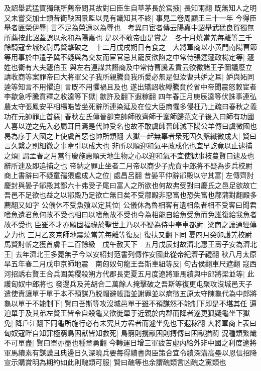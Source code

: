 及詔舉武猛賀獨無所薦帝問其故對曰臣生自草茅長於宫掖|{
	長知兩翻}
既無知人之明又未嘗交加士類昔衛鞅因景監以見有識知其不終|{
	事見二卷周顯王三十一年}
今得臣舉者匪榮伊辱|{
	言不足為榮適以為辱也　考異曰宦者傳云陽嘉中詔舉武猛良賀獨無所薦按此詔蓋誤以永和為陽嘉也}
是以不敢帝由是賞之　冬十月燒當羌每離等三千餘騎寇金城校尉馬賢擊破之　十二月戊戌朔日有食之　大將軍商以小黄門南陽曹節等用事於中遣子冀不疑與為交友而宦官忌其寵反欲陷之中常侍張逵蘧政楊定等|{
	蘧姓也衛有大夫蘧伯玉}
與左右連謀共譖商及中常侍曹騰孟賁云欲徵諸王子圖議廢立請收商等案罪帝曰大將軍父子我所親騰賁我所愛必無是但汝曹共妒之耳|{
	妒與妬同}
逵等知言不用懼迫|{
	言既不用懼禍且及也}
遂出矯詔收縛騰賁於省中帝聞震怒敇宦者李歙急呼騰賁釋之收逵等下獄|{
	歙許及翻下遐稼翻}
四年春正月庚辰逵等伏誅事連弘農太守張鳳安平相楊皓皆坐死辭所連染延及在位大臣商懼多侵枉乃上疏曰春秋之義功在元帥罪止首惡|{
	春秋左氏傳晉卻克帥師敗齊師于鞌師歸范文子後入曰師有功國人喜以逆之先入必屬耳目焉是代帥受名也故不敢虞師晉師滅下陽公羊傳曰虞微國也曷為序于大國之上使虞首惡也帥所類翻}
大獄一起無辜者衆死囚久繫纎微成大|{
	賢曰言久繫之則細微之事牽引以成大也}
非所以順迎和氣平政成化也宜早訖竟以止逮捕之煩|{
	謂孟春之月當行慶施惠順天地生物之心以迎和氣不宜使獄事枝蔓賢曰逮及也辭所連及即追捕之也}
帝納之罪止坐者二月帝以商少子虎賁中郎將不疑為步兵校尉商上書辭曰不疑童孺猥處成人之位|{
	處昌呂翻}
昔晏平仲辭鄁殿以守其富|{
	左傳齊討慶封與晏子鄁殿其鄙六十弗受子尾曰富人之所欲也何故弗受對曰慶氏之邑足欲故亡吾邑不足欲也益之以鄁殿乃足欲亡無日矣不受鄁殿非惡富也恐失富也鄁蒲對翻殿多薦翻又如字}
公儀休不受魚飱以定其位|{
	公儀休為魯相客有遺相魚者相不受客曰聞君嗜魚遺君魚何故不受也相曰以嗜魚故不受也今為相能自給魚受魚而免誰復給我魚者故不受也}
臣雖不才亦願固福祿於聖世上乃以不疑為侍中奉車都尉|{
	梁商之讓通經傳之力也}
三月乙亥京師地震燒當羌每離等復反|{
	復扶又翻下同}
夏四月癸卯護羌校尉馬賢討斬之獲首虜千二百餘級　戊午赦天下　五月戊辰封故濟北惠王壽子安為濟北王|{
	去年濟北王多薨無子今以安紹封范書列傳作安國此從帝紀濟子禮翻}
秋八月太原旱五年春二月戊申京師地震　南匈奴句龍王吾斯車紐等反|{
	句古侯翻車尺遮翻}
寇西河招誘右賢王合兵圍美稷殺朔方代郡長吏夏五月度遼將軍馬續與中郎將梁並等|{
	此護匈奴中郎將也}
發邊兵及羌胡合二萬餘人掩擊破之吾斯等復更屯聚攻沒城邑天子遣使責讓單于單于本不預謀乃脱帽避帳詣並謝罪並以病徵五原太守陳龜代為中郎將龜以單于不能制下|{
	賢曰吾斯等攻沒城邑單于雖不預謀然不能制下即是不堪其任}
逼迫單于及其弟左賢王皆令自殺龜又欲徙單于近親於内郡而降者遂更狐疑龜坐下獄免|{
	降戶江翻下同龜所施行必冇未究其方畧者而遽坐免也下遐稼翻}
大將軍商上表曰匈奴寇畔自知罪極窮鳥困獸皆知救死|{
	鳥窮則攫獸困則搏傳曰困獸猶鬭}
況種類繁熾不可單盡|{
	賢曰單亦盡也種章勇翻}
今轉運日增三軍疲苦虛内給外非中國之利度遼將軍馬續素有謀謨且典邊日久深曉兵要每得續書與臣策合宜令續深溝高壘以恩信招降宣示購賞明為期約如此則醜類可服|{
	賢曰醜等也余謂醜類言凶醜之黨類也}
